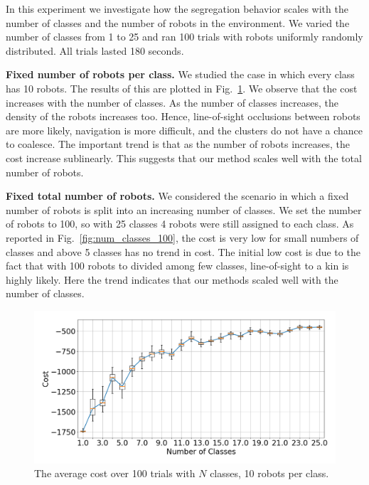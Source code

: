 \documentclass[letterpaper, 10 pt, conference]{ieeeconf}
\newcommand{\myparagraph}[1]{\textbf{#1.}}
\begin{document}
In this experiment we investigate how the segregation behavior scales with the
number of classes and the number of robots in the environment. We varied the
number of classes from 1 to 25 and ran 100 trials with robots uniformly randomly
distributed. All trials lasted 180 seconds.

\myparagraph{Fixed number of robots per class}
We studied the case in which every class has 10 robots. The results of this are
plotted in Fig.~\ref{fig:num_classes_10}. We observe that the cost increases
with the number of classes. As the number of classes increases,
the density of the robots increases too. Hence, line-of-sight occlusions between robots are more likely,
navigation is more difficult, and the clusters do not have a chance to coalesce.
The important trend is that as the number of robots increases, the cost increase sublinearly.
This suggests that our method scales well with the total number of robots.

\myparagraph{Fixed total number of robots}
We considered the scenario in which a fixed number of robots is split into an
increasing number of classes. We set the number of robots to 100, so with 25
classes 4 robots were still assigned to each class. As reported in
Fig.~\ref{fig:num_classes_100}, the cost is very low for small numbers of classes
and above 5 classes has no trend in cost. The initial low cost is due to the fact that
with 100 robots to divided among few classes, line-of-sight to a kin is highly likely.
Here the trend indicates that our methods scaled well with the number of classes.

\begin{figure}[t]
  \centering
  \includegraphics[width=1\linewidth]{./images/num_classes_vs_cost_10_per_class.png}
  \caption{The average cost over 100 trials with $N$ classes, 10 robots per class.}
  \label{fig:num_classes_10}
\end{figure}
\end{document}
